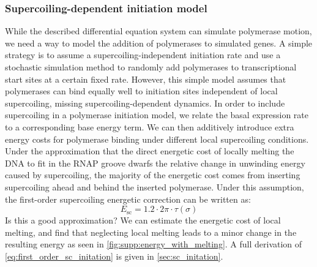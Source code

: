 \documentclass[11pt]{article} %
\begin{document}
\subsubsection{Supercoiling-dependent initiation model}
While the described differential equation system can simulate polymerase motion, we need a way to model the addition of polymerases to simulated genes. A simple strategy is to assume a supercoiling-independent initiation rate and use a stochastic simulation method to randomly add polymerases to transcriptional start sites at a certain fixed rate. However, this simple model assumes that polymerases can bind equally well to initiation sites independent of local supercoiling, missing supercoiling-dependent dynamics. In order to include supercoiling in a polymerase initiation model, we relate the basal expression rate to a corresponding base energy term. We can then additively introduce extra energy costs for polymerase binding under different local supercoiling conditions. Under the approximation that the direct energetic cost of locally melting the DNA to fit in the RNAP groove dwarfs the relative change in unwinding energy caused by supercoiling, the majority of the energetic cost comes from inserting supercoiling ahead and behind the inserted polymerase. Under this assumption, the first-order supercoiling energetic correction can be written as:
\begin{equation}
    E_\text{sc} = 1.2  \cdot 2\pi \cdot \tau(\sigma)
\label{eq:first_order_sc_initation}
\end{equation}
 Is this a good approximation? We can estimate the energetic cost of local melting, and find that neglecting local melting leads to a minor change in the resulting energy as seen in \cref{fig:supp:energy_with_melting}. A full derivation of \cref{eq:first_order_sc_initation} is given in \cref{sec:sc_initation}.
\end{document}
